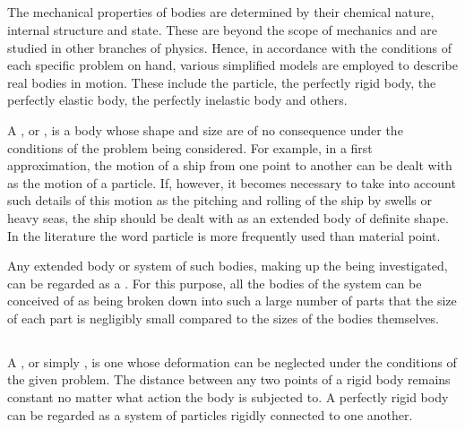 \subsection{}\label{1.1.3}The mechanical properties of bodies are determined by their chemical nature, internal structure and state. These are beyond the scope of mechanics and are studied in other branches of physics. Hence, in accordance with the conditions of each specific problem on hand, various simplified models are employed to describe real bodies in motion. These include the particle, the perfectly rigid body, the perfectly elastic body, the perfectly inelastic body and others.

A , or , is a body whose shape and size are of no consequence under the conditions of the problem being considered. For example, in a first approximation, the motion of a ship from one point to another can be dealt with as the motion of a particle. If, however, it becomes necessary to take into account such details of this motion as the pitching and rolling of the ship by swells or heavy seas, the ship should be dealt with as an extended body of definite shape. In the liter­ature the word particle is more frequently used than mate­rial point.

Any extended body or system of such bodies, making up the  being investigated, can be regarded as a . For this purpose, all the bodies of the system can be conceived of as being broken down into such a large number of parts that the size of each part is negligibly small compared to the sizes of the bodies themselves.

\subsection{}\label{1.1.4} A , or simply , is one whose deformation can be neglected under the conditions of the given problem. The distance between any two points of a rigid body remains constant no matter what action the body is subjected to. A perfectly rigid body can be regarded as a system of par­ticles rigidly connected to one another.

